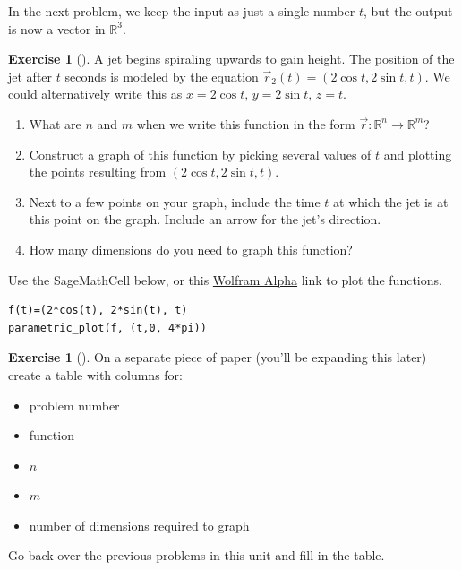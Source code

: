 \documentclass[10pt,]{book}
\theoremstyle{plain}
\theoremstyle{definition}
\theoremstyle{definition}
\theoremstyle{definition}
\theoremstyle{definition}
\newtheorem{exploration}[project]{Exercise}
\theoremstyle{definition}
\numberwithin{equation}{section}
\begin{document}
\par
In the next problem, we keep the input as just a single number \(t\), but the output is now a vector in \(\mathbb{R}^3\).%
\begin{exploration}[]\label{prob_jet_intro_for_space_curves}
A jet begins spiraling upwards to gain height. The position of the jet after \(t\) seconds is modeled by the equation \(\vec r_2(t)=(2\cos t, 2\sin t, t).\) We could alternatively write this as \(x=2\cos t,\, y=2\sin t,\, z=t\).%
\begin{enumerate}[font=\bfseries,label=(\alph*),ref=\alph*]
\item\label{task-176} What are \(n\) and \(m\) when we write this function in the form  \(\vec r\colon {\mathbb{R}}^n\to {\mathbb{R}}^m\)?%
\item\label{task-177} Construct a graph of this function by picking several values of \(t\) and plotting the points resulting from \((2\cos t, 2\sin t, t)\).%
\item\label{task-178} Next to a few points on your graph, include the time \(t\) at which the jet is at this point on the graph. Include an arrow for the jet's direction.%
\item\label{task-179} How many dimensions do you need to graph this function?%
\end{enumerate}
\bigbreak
Use the SageMathCell below, or this \href{http://www.wolframalpha.com/input/?i=parametric+plot+3D++\%282+cos+t\%2C+2+sin+t\%2C+t\%29+for+t+from+0+to+4+pi}{Wolfram Alpha} link to plot the functions.%
\begin{lstlisting}[style=sageinput]
f(t)=(2*cos(t), 2*sin(t), t)
parametric_plot(f, (t,0, 4*pi))
\end{lstlisting}
\end{exploration}
\begin{exploration}[]\label{prob_function_table}
On a separate piece of paper (you'll be expanding this later) create a table with columns for: \leavevmode%
\begin{itemize}[label=\textbullet]
\item{}problem number%
\item{}function%
\item{}\(n\)%
\item{}\(m\)%
\item{}number of dimensions required to graph%
\end{itemize}
%
\par
Go back over the previous problems in this unit and fill in the table.%
\end{exploration}
\typeout{************************************************}
\typeout{************************************************}
\end{document}
